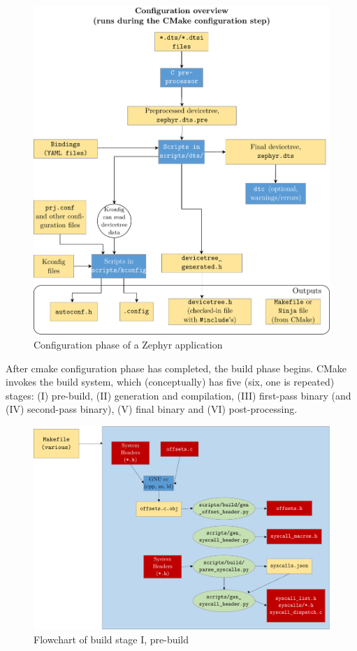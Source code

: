 \begin{figure}[htbp!]
	\centering
	\includegraphics[width=.8\textwidth]{Figures/3_cmake_configuration.pdf}
	\caption[Configuration phase of a Zephyr application]{Configuration phase of a Zephyr application \cite{zephyrprojectdocumentation}}
	\label{fig:3_cmake_configuration}
\end{figure}
After cmake configuration phase has completed, the build phase begins. CMake invokes the build system, which (conceptually) has five (six, one is repeated) stages: (I) pre-build, (II) generation and compilation, (III) first-pass binary (and (IV) second-pass binary), (V) final binary and (VI) post-processing.
\begin{figure}[htbp]
	\centering
	\includegraphics[width=.8\textwidth]{Figures/3_cmake_build1.pdf}
	\caption[Flowchart of build stage I, pre-build]{Flowchart of build stage I, pre-build}
	\label{fig:3_build1}
\end{figure}
